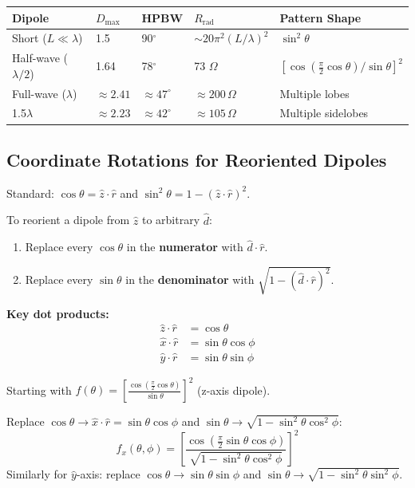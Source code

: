 \documentclass[10pt,letterpaper]{article}
\newcommand{\rhat}{\hat{r}}
\newcommand{\xhat}{\hat{x}}
\newcommand{\yhat}{\hat{y}}
\newcommand{\zhat}{\hat{z}}
\newcommand{\dhat}{\hat{d}}
\newcommand{\degrees}{^{\circ}}
\begin{document}
\begin{center}
\begin{tabular}{lllll}
\toprule
\textbf{Dipole} & \textbf{$D_\mathrm{max}$} & \textbf{HPBW} & \textbf{$R_\mathrm{rad}$} & \textbf{Pattern Shape} \\
\midrule
Short ($L\ll\lambda$) & 1.5 & 90$\degrees$ & $\sim 20\pi^2(L/\lambda)^2$ & $\sin^2\theta$ \\
Half-wave ($\lambda/2$) & 1.64 & 78$\degrees$ & 73 $\Omega$ & $[\cos(\frac{\pi}{2}\cos\theta)/\sin\theta]^2$ \\
Full-wave ($\lambda$) & $\approx 2.41$ & $\approx 47\degrees$ & $\approx 200\,\Omega$ & Multiple lobes \\
1.5$\lambda$ & $\approx 2.23$ & $\approx 42\degrees$ & $\approx 105\,\Omega$ & Multiple sidelobes \\
\bottomrule
\end{tabular}
\end{center}

\subsection{Coordinate Rotations for Reoriented Dipoles}

\begin{tcolorbox}[formulabox, title={Coordinate Rotation Substitution Rule}]
Standard: $\cos\theta = \zhat\cdot\rhat$ and $\sin^2\theta = 1 - (\zhat\cdot\rhat)^2$.

To reorient a dipole from $\zhat$ to arbitrary $\dhat$:
\begin{enumerate}[noitemsep]
  \item Replace every $\cos\theta$ in the \textbf{numerator} with $\dhat\cdot\rhat$.
  \item Replace every $\sin\theta$ in the \textbf{denominator} with $\sqrt{1-(\dhat\cdot\rhat)^2}$.
\end{enumerate}
\textbf{Key dot products:}
\begin{align*}
  \zhat\cdot\rhat &= \cos\theta \\
  \xhat\cdot\rhat &= \sin\theta\cos\phi \\
  \yhat\cdot\rhat &= \sin\theta\sin\phi
\end{align*}
\end{tcolorbox}

\begin{tcolorbox}[examplebox, title={HW1 P3 Example: Half-Wave Dipole Reoriented to $\xhat$}]
Starting with $f(\theta) = \left[\frac{\cos(\frac{\pi}{2}\cos\theta)}{\sin\theta}\right]^2$ (z-axis dipole).

Replace $\cos\theta \to \xhat\cdot\rhat = \sin\theta\cos\phi$ and $\sin\theta \to \sqrt{1-\sin^2\theta\cos^2\phi}$:
\begin{equation}
  f_x(\theta,\phi) = \left[\frac{\cos\!\left(\frac{\pi}{2}\sin\theta\cos\phi\right)}{\sqrt{1-\sin^2\theta\cos^2\phi}}\right]^2
\end{equation}
Similarly for $\yhat$-axis: replace $\cos\theta \to \sin\theta\sin\phi$ and $\sin\theta \to \sqrt{1-\sin^2\theta\sin^2\phi}$.
\end{tcolorbox}
\end{document}
